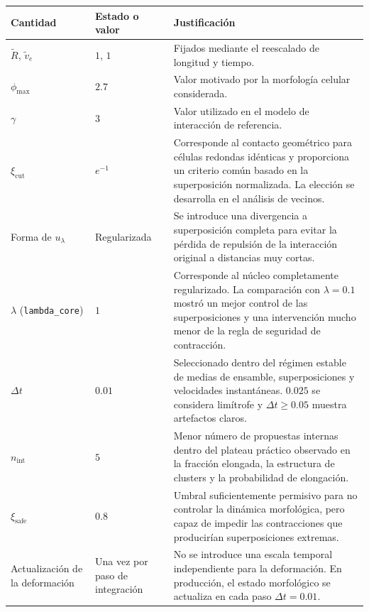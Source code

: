 \documentclass[11pt,a4paper]{article}
\begin{document}
\small
\begin{longtable}
	{p{}p{}p{}}
	\toprule
	Cantidad & Estado o valor & Justificación \\
	\midrule
	\endhead

	$\widetilde R$, $\widetilde v_e$
	& $1$, $1$
	& Fijados mediante el reescalado de longitud y tiempo. \\

	$\phi_{\max}$
	& $2.7$
	& Valor motivado por la morfología celular considerada. \\

	$\gamma$
	& $3$
	& Valor utilizado en el modelo de interacción de referencia. \\

	$\xi_{\mathrm{cut}}$
	& $e^{-1}$
	& Corresponde al contacto geométrico para células redondas idénticas
	y proporciona un criterio común basado en la superposición normalizada.
	La elección se desarrolla en el análisis de vecinos. \\

	Forma de $u_\lambda$
	& Regularizada
	& Se introduce una divergencia a superposición completa para evitar
	la pérdida de repulsión de la interacción original a distancias muy
	cortas. \\

	$\lambda$ (\texttt{lambda\_core})
	& $1$
	& Corresponde al núcleo completamente regularizado. La comparación
	con $\lambda=0.1$ mostró un mejor control de las superposiciones y una
	intervención mucho menor de la regla de seguridad de contracción. \\

	$\Delta t$
	& $0.01$
	& Seleccionado dentro del régimen estable de medias de ensamble,
	superposiciones y velocidades instantáneas. $0.025$ se considera
	limítrofe y $\Delta t\geq0.05$ muestra artefactos claros. \\

	$n_{\mathrm{int}}$
	& $5$
	& Menor número de propuestas internas dentro del plateau práctico observado
	en la fracción elongada, la estructura de clusters y la probabilidad de
	elongación. \\

	$\xi_{\mathrm{safe}}$
	& $0.8$
	& Umbral suficientemente permisivo para no controlar la dinámica
	morfológica, pero capaz de impedir las contracciones que producirían
	superposiciones extremas. \\

	Actualización de la deformación
	& Una vez por paso de integración
	& No se introduce una escala temporal independiente para la deformación.
	En producción, el estado morfológico se actualiza en cada paso
	$\Delta t=0.01$. \\


\end{longtable}
\end{document}
